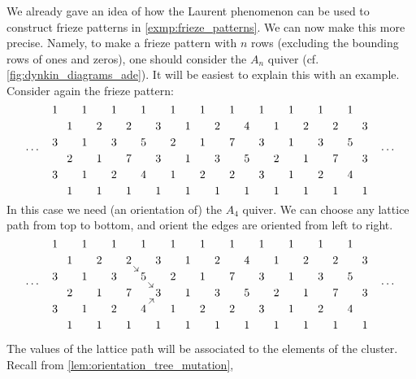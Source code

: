 \begin{example}

	We already gave an idea of how the Laurent phenomenon can be used to construct frieze
	patterns in \cref{exmp:frieze_patterns}. We can now make this
	more precise. Namely, to make a frieze pattern with $n$ rows (excluding the bounding
	rows of ones and zeros), one should consider the $A_n$ quiver (cf.
	\cref{fig:dynkin_diagrams_ade}). It will be easiest to explain this with an example.
	Consider again the frieze pattern:
	\begin{equation*}
		\dots\quad
		\begin{tikzcd}[
				sep = 0.2em, cramped,
			]
			1&&1&&1&&1&&1&&1&&1&&1&&1&&1&&1\\
			&1&&2&&2&&3&&1&&2&&4&&1&&2&&2&&3\\
			3&&1&&3&&5&&2&&1&&7&&3&&1&&3&&5\\
			&2&&1&&7&&3&&1&&3&&5&&2&&1&&7&&3\\
			3&&1&&2&&4&&1&&2&&2&&3&&1&&2&&4\\
			&1&&1&&1&&1&&1&&1&&1&&1&&1&&1&&1
		\end{tikzcd}
		\quad
		\dots
	\end{equation*}
	In this case we need (an orientation of) the $A_4$ quiver. We can choose any lattice
	path from top to bottom, and orient the edges are oriented from
	left to right.
	\begin{equation*}
		\dots\quad
		\begin{tikzcd}[
				sep = 0.2em, cramped,
			]
			1&&1&&1&&1&&1&&1&&1&&1&&1&&1&&1\\
			&1&&2&&2\drar[shorten=-0.15em] &&3&&1&&2&&4&&1&&2&&2&&3\\
			3&&1&&3&&5 \drar[shorten=-0.15em] &&2&&1&&7&&3&&1&&3&&5\\
			&2&&1&&7&&3&&1&&3&&5&&2&&1&&7&&3\\
			3&&1&&2&&4\urar[shorten=-0.15em] &&1&&2&&2&&3&&1&&2&&4\\
			&1&&1&&1&&1&&1&&1&&1&&1&&1&&1&&1
		\end{tikzcd}
		\quad
		\dots
	\end{equation*}

	The values of the lattice path will be associated to the elements of the cluster. Recall from \cref{lem:orientation_tree_mutation}, 
	

\end{example}
